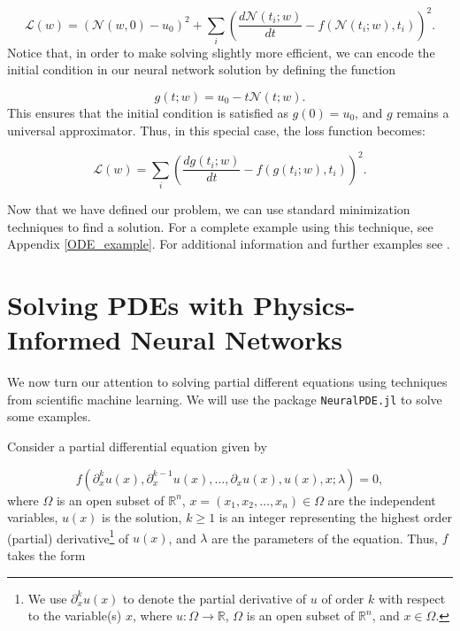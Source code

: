 \documentclass{CUP-JNL-DTM}%
\theoremstyle{definition}
\numberwithin{equation}{section}
\newcommand{\loss}{\mathcal{L}}
\newcommand{\net}{\mathcal{N}}
\begin{document}
\begin{equation}
	\loss(w) = (\net(w,0) - u_0)^2 + \sum_i \left( \frac{d\net(t_i;w)}{dt} - f(\net(t_i;w), t_i) \right)^2.
\end{equation}
Notice that, in order to make solving slightly more efficient, we can encode the initial condition in our neural network solution by defining the function 

\begin{equation}
	g(t;w) = u_0 - t\net(t;w).
\end{equation}
This ensures that the initial condition is satisfied as $g(0) = u_0$, and $g$ remains a universal approximator. Thus, in this special case, the loss function becomes:

\begin{equation}
	\loss(w) = \sum_i \left(\frac{dg(t_i;w)}{dt} - f(g(t_i;w), t_i)\right)^2. 
\end{equation}

Now that we have defined our problem, we can use standard minimization techniques to find a solution. For a complete example using this technique, see Appendix \ref{ODE_example}. For additional information and further examples see \cite{rackauckasSciMLSciMLBookParallel}. 


\section{Solving PDEs with Physics-Informed Neural Networks}
\label{sec:PDE}

We now turn our attention to solving partial different equations using techniques from scientific machine learning. We will use the package \texttt{NeuralPDE.jl} \cite{zubovNeuralPDEAutomatingPhysicsInformed2021} to solve some examples. 

Consider a partial differential equation given by 

\begin{equation}
	f(\partial^k_xu(x), \partial^{k-1}_x u(x), \dots, \partial_x u(x), u(x), x; \lambda) = 0,
\end{equation}
where $\Omega$ is an open subset of $\mathbb{R}^n$, $x = (x_1, x_2, \dots, x_n) \in \Omega$ are the independent variables, $u(x)$ is the solution, $k \ge 1$ is an integer representing the highest order (partial) derivative\footnote{We use $\partial_x^k u(x)$ to denote the partial derivative of $u$ of order $k$ with respect to the variable(s) $x$, where $u:\Omega \rightarrow \mathbb{R}$, $\Omega$ is an open subset of $\mathbb{R}^n$, and $x \in \Omega$.} of $u(x)$, and $\lambda$ are the parameters of the equation. Thus, $f$ takes the form
\end{document}
